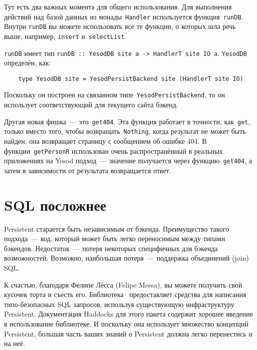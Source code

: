 Тут есть два важных момента для общего использования. Для выполнения действий
над базой данных из монады~\lstinline'Handler' используется
функция~\lstinline'runDB'. Внутри \lstinline'runDB' вы можете использовать все
те функции, о которых шла речь выше, например, \lstinline'insert'
и~\lstinline'selectList'.

\begin{remark}
    \lstinline'runDB' имеет тип
    \lstinline'runDB :: YesodDB site a -> HandlerT site IO a'.
    \lstinline'YesodDB' определён, как:

    \begin{lstlisting}
    type YesodDB site = YesodPersistBackend site (HandlerT site IO)
    \end{lstlisting}

    Поскольку он построен на связанном типе~\lstinline'YesodPersistBackend', то
    он использует соответствующий для текущего сайта бэкенд.
\end{remark}

Другая новая фишка~--- это~\lstinline'get404'. Эта функция работает в точности,
как~\lstinline'get', только вместо того, чтобы возвращать~\lstinline'Nothing',
когда результат не может быть найден, она возвращает страницу с сообщением об
ошибке 404. В функции~\lstinline'getPersonR' использован очень распространённый
в реальных приложениях на Yesod подход~--- значение получается через
функцию~\lstinline'get404', а затем в зависимости от результата возвращается
ответ.

\section{SQL посложнее}
Persistent старается быть независимым от бэкенда. Преимущество такого
подхода~--- код, который может быть легко переносимым между типами бэкендов.
Недостаток~--- потеря некоторых специфичных для бэкенда возможностей. Возможно,
наибольшая потеря~--- поддержка объединений (join) SQL.

К счастью, благодаря Фелипе Лёсса (Felipe Messa), вы можете получить свой
кусочек торта и съесть его.
Библиотека~
предоставляет средства для написания типо-безопасных SQL запросов, используя
существующую инфраструктуру Persistent. Документация Haddocks для этого пакета
содержит хорошее введение в использование библиотеке. И поскольку она
использует множество концепций Persistent, большая часть ваших знаний о
Persistent должна легко перенестись и на неё.

